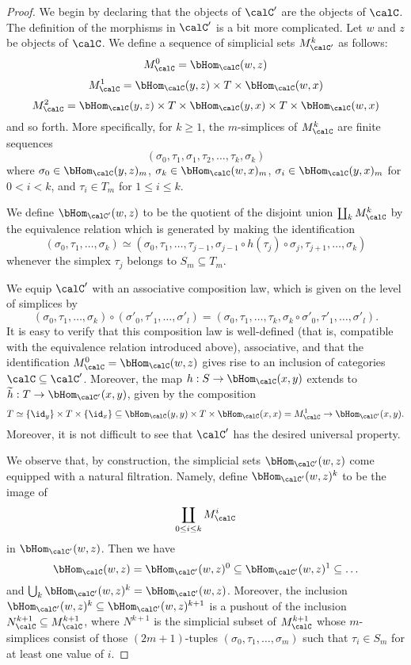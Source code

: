 \begin{proof}
We begin by declaring that the objects of $\calC'$ are the objects of $\calC$. 
The definition of the morphisms in $\calC'$ is a bit more complicated. Let $w$ and $z$ be objects of $\calC$. We define a sequence of simplicial sets $M_{\calC'}^{k}$ as follows:
$$M_{\calC}^0 = \bHom_{\calC}(w,z)$$
$$M_{\calC}^1 = \bHom_{\calC}(y,z) \times T \times \bHom_{\calC}(w,x)$$
$$M_{\calC}^2 = \bHom_{\calC}(y,z) \times T \times \bHom_{\calC}(y,x) \times
T \times \bHom_{\calC}(w,x)$$ 
and so forth. More specifically, for $k \geq 1$, the $m$-simplices of $M_{\calC}^k$ are finite sequences
$$( \sigma_0, \tau_1, \sigma_1, \tau_2, \ldots, \tau_k, \sigma_k)$$ where 
$\sigma_0 \in \bHom_{\calC}(y,z)_m$, $\sigma_k \in \bHom_{\calC}(w,x)_m$, $\sigma_i \in \bHom_{\calC}(y,x)_m$ for $0 < i < k$, and $\tau_i \in T_m$ for $1 \leq i \leq k$.

We define $\bHom_{\calC'}(w,z)$ to be the quotient of the disjoint union
$ \coprod_{k} M_{\calC}^k$ by the equivalence relation which is generated by making the identification
$$( \sigma_0, \tau_1, \ldots, \sigma_k) \simeq (\sigma_0, \tau_1, \ldots, \tau_{j-1}, \sigma_{j-1} \circ h(\tau_j) \circ \sigma_{j}, \tau_{j+1}, \ldots, \sigma_k )$$ whenever the simplex $\tau_j$ belongs to $S_m \subseteq T_m$.

We equip $\calC'$ with an associative composition law, which is given on the level of simplices
by $$( \sigma_0, \tau_1, \ldots, \sigma_k ) \circ (\sigma'_0, \tau'_1, \ldots, \sigma'_l) =
(\sigma_0, \tau_1, \ldots, \tau_k, \sigma_k \circ \sigma'_0, \tau'_1, \ldots, \sigma'_l).$$
It is easy to verify that this composition law is well-defined (that is, compatible with the equivalence relation introduced above), associative, and that the identification $M_{\calC}^0 = \bHom_{\calC}(w,z)$ gives rise to an inclusion of categories $\calC \subseteq \calC'$. Moreover, the map 
$h: S \rightarrow \bHom_{\calC}(x,y)$ extends to $\widetilde{h}: T \rightarrow \bHom_{\calC'}(x,y)$, given by the composition
$$ T \simeq \{ \id_y \} \times T \times \{ \id_x\} \subseteq \bHom_{\calC}(y,y) \times T \times \bHom_{\calC}(x,x) = M_{\calC}^1 \rightarrow \bHom_{\calC'}(x,y).$$
Moreover, it is not difficult to see that $\calC'$ has the desired universal property.

We observe that, by construction, the simplicial sets $\bHom_{\calC'}(w,z)$ come equipped with a natural filtration. Namely, define $\bHom_{\calC'}(w,z)^k$ to be the image of
$$ \coprod_{0 \leq i \leq k} M_{\calC}^i $$ in $\bHom_{\calC'}(w,z)$. Then we have
$$ \bHom_{\calC}(w,z) = \bHom_{\calC'}(w,z)^0 \subseteq \bHom_{\calC'}(w,z)^1 \subseteq \ldots$$
and $\bigcup_{k} \bHom_{\calC'}(w,z)^k = \bHom_{\calC'}(w,z)$. Moreover, the inclusion
$ \bHom_{\calC'}(w,z)^k \subseteq \bHom_{\calC'}(w,z)^{k+1}$ is a pushout of the inclusion
$N_{\calC}^{k+1} \subseteq M_{\calC}^{k+1}$, where $N^{k+1}$ is the simplicial subset of $M_{\calC}^{k+1}$ whose
$m$-simplices consist of those $(2m+1)$-tuples $(\sigma_0, \tau_1, \ldots, \sigma_m)$ such that
$\tau_i \in S_m$ for at least one value of $i$.


\end{proof}
